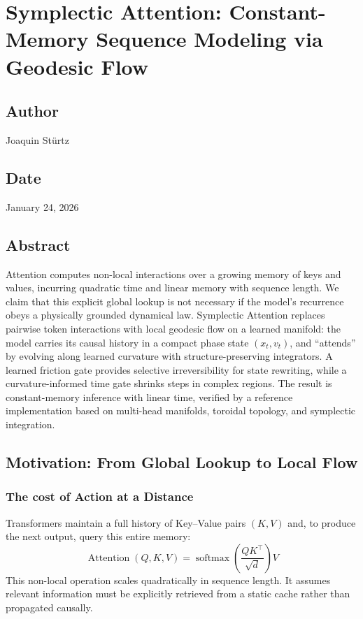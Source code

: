 \documentclass{article}
\numberwithin{equation}{section}
\begin{document}
\section{Symplectic Attention: Constant-Memory Sequence Modeling via Geodesic Flow}
\subsection*{Author}
Joaquin Stürtz
\subsection*{Date}
January 24, 2026
\subsection*{Abstract}
Attention computes non-local interactions over a growing memory of keys and values, incurring quadratic time and linear memory with sequence length. We claim that this explicit global lookup is not necessary if the model’s recurrence obeys a physically grounded dynamical law. Symplectic Attention replaces pairwise token interactions with local geodesic flow on a learned manifold: the model carries its causal history in a compact phase state $(x_t, v_t)$, and ``attends'' by evolving along learned curvature with structure-preserving integrators. A learned friction gate provides selective irreversibility for state rewriting, while a curvature-informed time gate shrinks steps in complex regions. The result is constant-memory inference with linear time, verified by a reference implementation based on multi-head manifolds, toroidal topology, and symplectic integration.

\subsection{Motivation: From Global Lookup to Local Flow}
\subsubsection{The cost of Action at a Distance}
Transformers maintain a full history of Key–Value pairs $(K, V)$ and, to produce the next output, query this entire memory:
\[
\operatorname{Attention}(Q, K, V) = \operatorname{softmax}\!\left(\frac{QK^\top}{\sqrt{d}}\right)V
\]
This non-local operation scales quadratically in sequence length. It assumes relevant information must be explicitly retrieved from a static cache rather than propagated causally.
\end{document}
